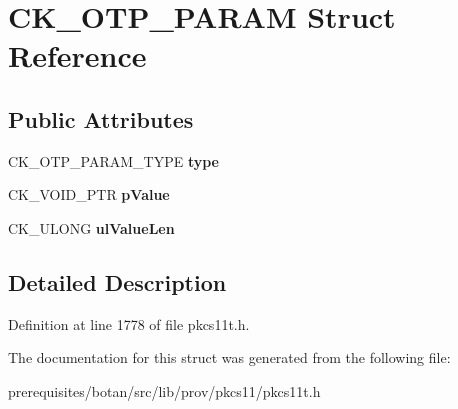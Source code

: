 \hypertarget{struct_c_k___o_t_p___p_a_r_a_m}{}\section{C\+K\+\_\+\+O\+T\+P\+\_\+\+P\+A\+R\+AM Struct Reference}
\label{struct_c_k___o_t_p___p_a_r_a_m}
\subsection*{Public Attributes}
\begin{DoxyCompactItemize}
\item 
\mbox{\label{struct_c_k___o_t_p___p_a_r_a_m_a62fc02521f61dcfa046fd8118edc69dd}} 
C\+K\+\_\+\+O\+T\+P\+\_\+\+P\+A\+R\+A\+M\+\_\+\+T\+Y\+PE {\bfseries type}
\item 
\mbox{\label{struct_c_k___o_t_p___p_a_r_a_m_a21cb84a6ae53333db95cfbb7ba351b4f}} 
C\+K\+\_\+\+V\+O\+I\+D\+\_\+\+P\+TR {\bfseries p\+Value}
\item 
\mbox{\label{struct_c_k___o_t_p___p_a_r_a_m_a1cb40dfa8b0f26ca3f2eabc5297e513c}} 
C\+K\+\_\+\+U\+L\+O\+NG {\bfseries ul\+Value\+Len}
\end{DoxyCompactItemize}


\subsection{Detailed Description}


Definition at line 1778 of file pkcs11t.\+h.



The documentation for this struct was generated from the following file\+:\begin{DoxyCompactItemize}
\item 
prerequisites/botan/src/lib/prov/pkcs11/pkcs11t.\+h\end{DoxyCompactItemize}
